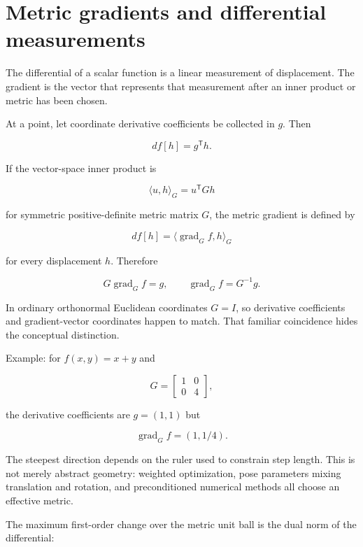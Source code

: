 \hypertarget{appendix-f4acdb1d5563}{}\label{referencestart:appendix-f4acdb1d5563}
\section{Metric gradients and differential measurements}\label{appendix-f4acdb1d5563-metric-gradients-and-differential-measurements}

\hypertarget{appendix-f4acdb1d5563-metric-gradients-and-differential-measurements}{}

The differential of a scalar function is a linear measurement of displacement. The gradient is the vector that represents that measurement after an inner product or metric has been chosen.

At a point, let coordinate derivative coefficients be collected in \(g\). Then

\[
df[h]=g^{\mathsf T}h.
\]

If the vector-space inner product is

\[
\langle u,h\rangle_G=u^{\mathsf T}Gh
\]

for symmetric positive-definite metric matrix \(G\), the metric gradient is defined by

\[
df[h]=\langle \operatorname{grad}_G f,h\rangle_G
\]

for every displacement \(h\). Therefore

\[
G\operatorname{grad}_G f=g,
\qquad
\operatorname{grad}_G f=G^{-1}g.
\]

In ordinary orthonormal Euclidean coordinates \(G=I\), so derivative coefficients and gradient-vector coordinates happen to match. That familiar coincidence hides the conceptual distinction.

Example: for \(f(x,y)=x+y\) and

\[
G=\begin{bmatrix}1&0\\0&4\end{bmatrix},
\]

the derivative coefficients are \(g=(1,1)\) but

\[
\operatorname{grad}_G f=(1,1/4).
\]

The steepest direction depends on the ruler used to constrain step length. This is not merely abstract geometry: weighted optimization, pose parameters mixing translation and rotation, and preconditioned numerical methods all choose an effective metric.

The maximum first-order change over the metric unit ball is the dual norm of the differential:

